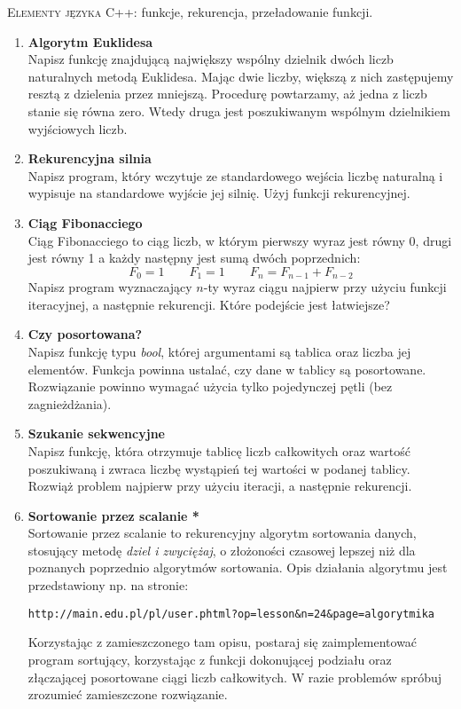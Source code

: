 \documentclass[12pt]{article}
\begin{document}
\small \textsc{Elementy języka C++:} funkcje, rekurencja, przeładowanie funkcji.

\begin{enumerate}

\item \textbf{Algorytm Euklidesa}\\
Napisz funkcję znajdującą największy wspólny dzielnik dwóch liczb naturalnych metodą Euklidesa. Mając dwie liczby, większą z nich zastępujemy resztą z dzielenia przez mniejszą. Procedurę powtarzamy, aż jedna z liczb stanie się równa zero. Wtedy druga jest poszukiwanym wspólnym dzielnikiem wyjściowych liczb.

\item \textbf{Rekurencyjna silnia}\\
Napisz program, który wczytuje ze standardowego wejścia liczbę naturalną i wypisuje na standardowe wyjście jej silnię. Użyj funkcji rekurencyjnej.

\item \textbf{Ciąg Fibonacciego}\\
Ciąg Fibonacciego to ciąg liczb, w którym pierwszy wyraz jest równy 0, drugi jest równy 1 a każdy następny jest sumą dwóch poprzednich:
\[
F_0=1 \quad \quad F_1=1 \quad \quad F_n=F_{n-1}+F_{n-2}
\]
Napisz program wyznaczający $n$-ty wyraz ciągu najpierw przy użyciu funkcji iteracyjnej, a następnie rekurencji. Które podejście jest łatwiejsze?

\item \textbf{Czy posortowana?}\\
Napisz funkcję typu \textit{bool}, której argumentami są tablica oraz liczba jej elementów. Funkcja powinna ustalać, czy dane w tablicy są posortowane. Rozwiązanie powinno wymagać użycia tylko pojedynczej pętli (bez zagnieżdżania).

\item \textbf{Szukanie sekwencyjne}\\
Napisz funkcję, która otrzymuje tablicę liczb całkowitych oraz wartość poszukiwaną i zwraca liczbę wystąpień tej wartości w podanej tablicy. Rozwiąż problem najpierw przy użyciu iteracji, a następnie rekurencji.

\item \textbf{Sortowanie przez scalanie *}\\
Sortowanie przez scalanie to rekurencyjny algorytm sortowania danych, stosujący metodę \textit{dziel i zwyciężaj}, o złożoności czasowej lepszej niż dla poznanych poprzednio algorytmów sortowania. Opis działania algorytmu jest przedstawiony np. na stronie: \begin{verbatim}http://main.edu.pl/pl/user.phtml?op=lesson&n=24&page=algorytmika
\end{verbatim}
Korzystając z zamieszczonego tam opisu, postaraj się zaimplementować program sortujący, korzystając z funkcji dokonującej podziału oraz złączającej posortowane ciągi liczb całkowitych. W razie problemów spróbuj zrozumieć zamieszczone rozwiązanie.


\end{enumerate}
\end{document}
